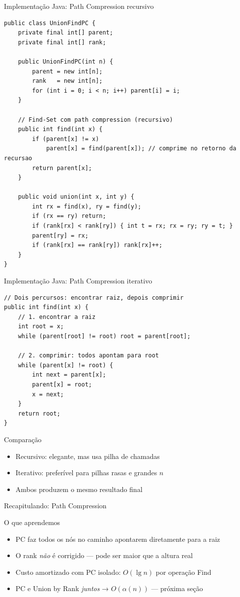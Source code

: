 \documentclass[aspectratio=169]{beamer}
\begin{document}
\begin{frame}[fragile,shrink=30]{Implementação Java: Path Compression recursivo}%
\begin{lstlisting}
public class UnionFindPC {
    private final int[] parent;
    private final int[] rank;

    public UnionFindPC(int n) {
        parent = new int[n];
        rank   = new int[n];
        for (int i = 0; i < n; i++) parent[i] = i;
    }

    // Find-Set com path compression (recursivo)
    public int find(int x) {
        if (parent[x] != x)
            parent[x] = find(parent[x]); // comprime no retorno da recursao
        return parent[x];
    }

    public void union(int x, int y) {
        int rx = find(x), ry = find(y);
        if (rx == ry) return;
        if (rank[rx] < rank[ry]) { int t = rx; rx = ry; ry = t; }
        parent[ry] = rx;
        if (rank[rx] == rank[ry]) rank[rx]++;
    }
}
\end{lstlisting}
\end{frame}

\begin{frame}[fragile,shrink=25]{Implementação Java: Path Compression iterativo}%
\begin{lstlisting}
// Dois percursos: encontrar raiz, depois comprimir
public int find(int x) {
    // 1. encontrar a raiz
    int root = x;
    while (parent[root] != root) root = parent[root];

    // 2. comprimir: todos apontam para root
    while (parent[x] != root) {
        int next = parent[x];
        parent[x] = root;
        x = next;
    }
    return root;
}
\end{lstlisting}
\vspace{0.3cm}
\begin{block}{Comparação}
  \begin{itemize}
    \item Recursivo: elegante, mas usa pilha de chamadas
    \item Iterativo: preferível para pilhas rasas e grandes $n$
    \item Ambos produzem o mesmo resultado final
  \end{itemize}
\end{block}
\end{frame}

\begin{frame}{Recapitulando: Path Compression}%
  \begin{block}{O que aprendemos}
    \begin{itemize}
      \item PC faz todos os nós no caminho apontarem diretamente para a raiz
      \item O rank \emph{não} é corrigido — pode ser maior que a altura real
      \item Custo amortizado com PC isolado: $O(\lg n)$ por operação Find
      \item PC e Union by Rank \emph{juntos} → $O(\alpha(n))$ — próxima seção
    \end{itemize}
  \end{block}
\end{frame}
\end{document}
